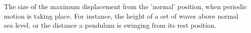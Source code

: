 The size of the maximum displacement from the 'normal' position,
when periodic motion is taking place. For instance, the height
of a set of waves above normal sea level, or the distance a pendulum is swinging from its rest position.